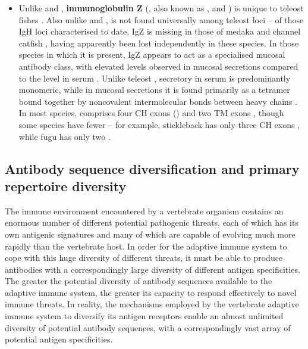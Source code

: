 \begin{itemize}
\item Unlike  and , \textbf{immunoglobulin Z} (, also known as ,  and ) is unique to teleost fishes \parencite{fillatreau2013astonishing}. Also unlike  and ,  is not found universally among teleost loci -- of those IgH loci characterised to date, IgZ is missing in those of medaka and channel catfish \parencite{fillatreau2013astonishing,magadan2011medaka}, having apparently been lost independently in these species. In those species in which it is present, IgZ appears to act as a specialised mucosal antibody class, with elevated levels observed in mucosal secretions compared to the level in serum \parencite{zhang2010igtgut,fillatreau2013astonishing,xu2013igtskin}. Unlike teleost , secretory  in serum is predominantly monomeric, while in mucosal secretions it is found primarily as a tetramer bound together by noncovalent intermolecular bonds between heavy chains \parencite{zhang2010igtgut}. In most species,  comprises four CH exons () and two TM exons \parencite{mashoof2016immunoglobulins}, though some species have fewer -- for example, stickleback  has only three CH exons \parencite{bao2010stickleback,gambondeza2011stickleback}, while fugu  has only two \parencite{fillatreau2013astonishing,savan2005fugu}.
\end{itemize}

\subsection{Antibody sequence diversification and primary repertoire diversity}
\label{sec:intro_immunity_primary}


The immune environment encountered by a vertebrate organism contains an enormous number of different potential pathogenic threats, each of which has its own antigenic signatures and many of which are capable of evolving much more rapidly than the vertebrate host. In order for the adaptive immune system to cope with this huge diversity of different threats, it must be able to produce antibodies with a correspondingly large diversity of different antigen specificities. The greater the potential diversity of antibody sequences available to the adaptive immune system, the greater its capacity to respond effectively to novel immune threats. In reality, the mechanisms employed by the vertebrate adaptive immune system to diversify its antigen receptors enable an almost unlimited diversity of potential antibody sequences, with a correspondingly vast array of potential antigen specificities.

